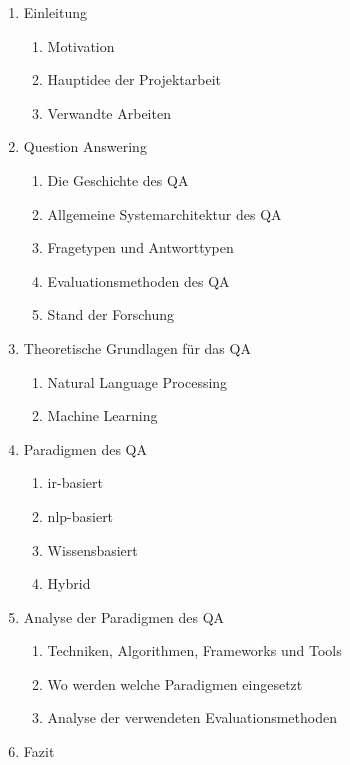 \documentclass[
        ngerman,
        paper=a4,
        numbers=noendperiod,
]{scrreprt}
\begin{document}
\renewcommand{\labelenumii}{\theenumii}
\renewcommand{\theenumii}{\theenumi.\arabic{enumii}.}

\begin{enumerate}

\item Einleitung
    \begin{enumerate}
    \item Motivation
    \item Hauptidee der Projektarbeit
    \item Verwandte Arbeiten
  \end{enumerate}
  
  
\item Question Answering
    \begin{enumerate}
    \item Die Geschichte des QA
    \item Allgemeine Systemarchitektur des QA
    \item Fragetypen und Antworttypen
    \item Evaluationsmethoden des QA
    \item Stand der Forschung
  \end{enumerate}
  
\item Theoretische Grundlagen für das QA
    \begin{enumerate}
    \item Natural Language Processing
    \item Machine Learning
  \end{enumerate}
  
\item Paradigmen des QA
    \begin{enumerate}
    \item \ac{ir}-basiert
    \item \ac{nlp}-basiert
    \item Wissensbasiert
    \item Hybrid
  \end{enumerate}

\item Analyse der Paradigmen des QA
    \begin{enumerate}
    \item Techniken, Algorithmen, Frameworks und Tools 
    \item Wo werden welche Paradigmen eingesetzt
    \item Analyse der verwendeten Evaluationsmethoden 
  \end{enumerate}
  
\item Fazit
  
  
  
\end{enumerate}
\end{document}
